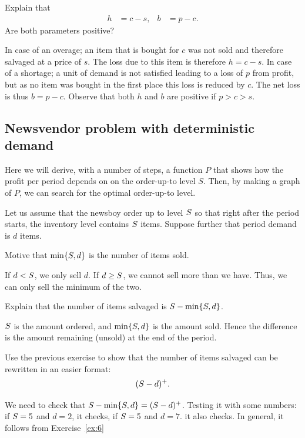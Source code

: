 \begin{exercise}
Explain that 
\begin{align}\label{eq:133}
h&=c-s, & b&=p-c.
\end{align}
Are both parameters positive?
\begin{solution}
In case of an overage; an item that is bought for $c$ was not sold and therefore salvaged at a price of $s$. The loss due to this item is therefore $h=c-s$. In case of a shortage; a unit of demand is not satisfied leading to a loss of $p$ from profit, but as no item was bought in the first place this loss is reduced by $c$. The net loss is thus $b=p-c$. Observe that both $h$ and $b$ are positive if $p>c>s$.
\end{solution}
\end{exercise}



\subsection{Newsvendor problem with deterministic demand}

Here we will derive, with a number of steps,  a function $P$ that shows how the profit per period depends on on the order-up-to level $S$. Then, by making a graph of $P$, we can search for the optimal order-up-to level.

Let us assume that the newsboy order up to level $S$ so that right after the period starts, the inventory level contains $S$ items. Suppose further that period demand is $d$ items. 

\begin{exercise}
Motive that $\min\{S,d\}$ is the number of items sold.
\begin{solution}
If $d<S$, we only sell $d$. If $d\geq S$, we cannot sell more than we have. Thus, we can only sell the minimum of the two.
\end{solution}
\end{exercise}


\begin{exercise}
Explain that the number of items salvaged is $S-\min\{S,d\}$. 
\begin{solution}
$S$ is the amount ordered, and $\min\{S, d\}$ is the amount sold. Hence the difference is the amount remaining (unsold) at the end of the period. 
\end{solution}
\end{exercise}

\begin{exercise}
Use the previous exercise to show that the number of items salvaged can be rewritten 
in an easier format:
\begin{align*}
(S-d)^+.
\end{align*}
\begin{solution}
We need to check that $S-\min\{S,d\} = (S-d)^+$. Testing it with some numbers: if $S=5$ and $d=2$, it checks, if $S=5$ and $d=7$. it also checks. In general, it follows from Exercise~\ref{ex:6} 
\end{solution}
\end{exercise}


